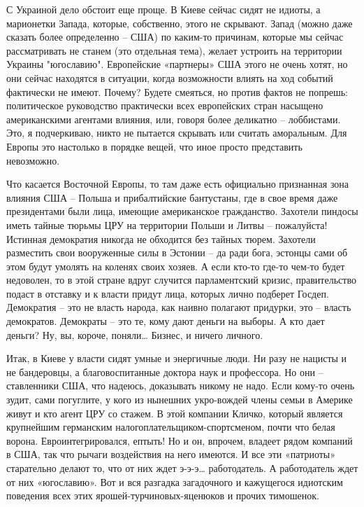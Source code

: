 С Украиной дело обстоит еще проще. В Киеве сейчас сидят не идиоты, а марионетки
Запада, которые, собственно, этого не скрывают. Запад (можно даже сказать более
определенно  – США) по каким-то причинам, которые мы сейчас рассматривать не
станем (это отдельная тема), желает устроить на территории Украины "югославию".
Европейские «партнеры» США этого не очень хотят, но они сейчас находятся в
ситуации, когда возможности влиять на ход событий фактически не имеют. Почему?
Будете смеяться, но против фактов не попрешь: политическое руководство
практически всех европейских стран насыщено американскими агентами влияния,
или, говоря более деликатно – лоббистами. Это, я подчеркиваю, никто не пытается
скрывать или считать аморальным. Для Европы это настолько в порядке вещей, что
иное просто представить невозможно.

Что касается Восточной Европы, то там даже есть официально признанная зона
влияния США – Польша и прибалтийские бантустаны, где в свое время даже
президентами были лица, имеющие американское гражданство. Захотели пиндосы
иметь тайные тюрьмы ЦРУ на территории Польши и Литвы – пожалуйста! Истинная
демократия никогда не обходится без тайных тюрем. Захотели разместить свои
вооруженные силы в Эстонии – да ради бога, эстонцы сами об этом будут умолять
на коленях своих хозяев. А если кто-то где-то чем-то будет недоволен, то в этой
стране вдруг случится парламентский кризис, правительство подаст в отставку и к
власти придут лица, которых лично подберет Госдеп. Демократия – это не власть
народа, как наивно полагают придурки, это – власть демократов. Демократы – это
те, кому дают деньги на выборы. А кто дает деньги? Ну, вы, короче, поняли…
Бизнес, и ничего личного.

Итак, в Киеве у власти сидят умные и энергичные люди. Ни разу не нацисты и не
бандеровцы, а благовоспитанные доктора наук и профессора. Но они – ставленники
США, что надеюсь, доказывать никому не надо. Если кому-то очень зудит, сами
погуглите, у кого из нынешних укро-вождей члены семьи в Америке живут и кто
агент ЦРУ со стажем. В этой компании Кличко, который является крупнейшим
германским налогоплательщиком-спортсменом, почти что белая ворона.
Евроинтегрировался, ептыть! Но и он, впрочем, владеет рядом компаний в США, так
что рычаги воздействия на него имеются. И все эти «патриоты» старательно делают
то, что от них ждет э-э-э… работодатель.  А работодатель ждет от них
«югославию». Вот и вся разгадка загадочного и кажущегося идиотским поведения
всех этих ярошей-турчиновых-яценюков и прочих тимошенок.

